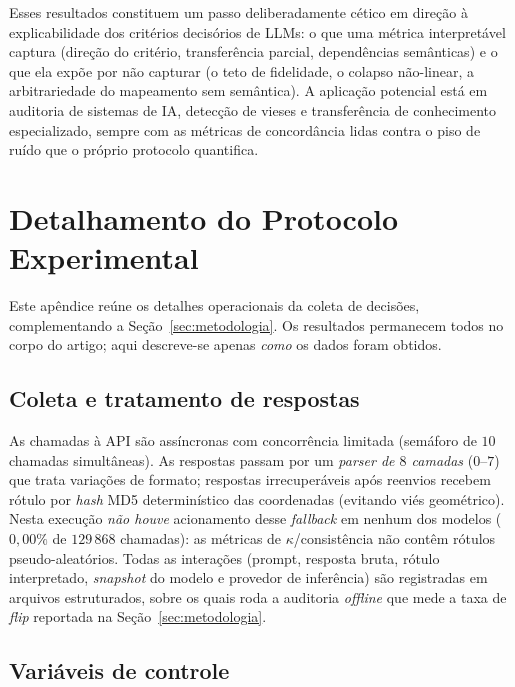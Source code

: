 \documentclass[12pt,a4paper]{article}
\begin{document}
Esses resultados constituem um passo deliberadamente cético em direção à explicabilidade
dos critérios decisórios de LLMs: o que uma métrica interpretável captura (direção do
critério, transferência parcial, dependências semânticas) e o que ela expõe por não
capturar (o teto de fidelidade, o colapso não-linear, a arbitrariedade do mapeamento sem
semântica). A aplicação potencial está em auditoria de sistemas de IA, detecção de vieses e
transferência de conhecimento especializado, sempre com as métricas de concordância lidas
contra o piso de ruído que o próprio protocolo quantifica.

\appendix

\section{Detalhamento do Protocolo Experimental}
\label{ap:protocolo}

Este apêndice reúne os detalhes operacionais da coleta de decisões, complementando a
Seção~\ref{sec:metodologia}. Os resultados permanecem todos no corpo do artigo; aqui
descreve-se apenas \emph{como} os dados foram obtidos.

\subsection{Coleta e tratamento de respostas}

As chamadas à API são assíncronas com concorrência limitada (semáforo de $10$ chamadas
simultâneas). As respostas passam por um \emph{parser
de $8$ camadas} ($0$–$7$) que trata variações de formato; respostas irrecuperáveis após
reenvios recebem rótulo por \emph{hash} MD5 determinístico das coordenadas (evitando viés
geométrico). Nesta execução \emph{não houve} acionamento desse \emph{fallback} em nenhum dos
modelos ($0{,}00\%$ de $129\,868$ chamadas): as métricas de $\kappa$/consistência não contêm
rótulos pseudo-aleatórios. Todas as interações (prompt, resposta bruta, rótulo
interpretado, \emph{snapshot} do modelo e provedor de inferência) são registradas em
arquivos estruturados, sobre os quais roda a auditoria \emph{offline} que mede a taxa de
\emph{flip} reportada na Seção~\ref{sec:metodologia}.

\subsection{Variáveis de controle}
\end{document}
